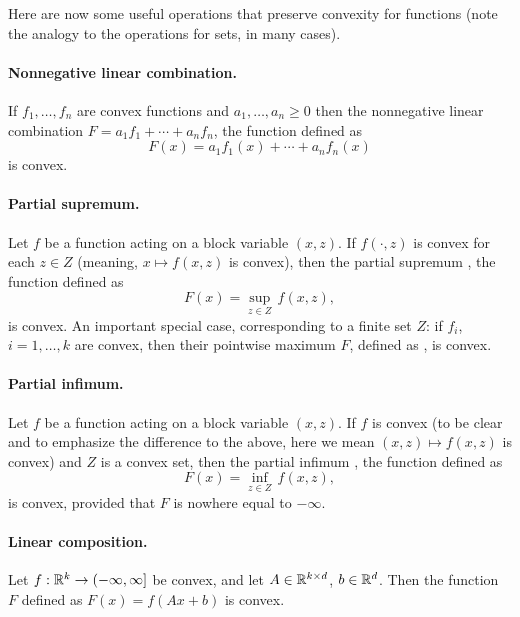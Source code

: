 \medskip

Here are now some useful operations that preserve convexity for functions (note
the analogy to the operations for sets, in many cases). 

\paragraph{Nonnegative linear combination.} 

If $f_1,\ldots,f_n$ are convex functions and $a_1,\ldots,a_n \geq 0$ then the
nonnegative linear combination $F = a_1f_1+\cdots+a_nf_n$, the function defined
as
\[
F(x) = a_1f_1(x) + \cdots + a_nf_n(x) 
\]
is convex.

\paragraph{Partial supremum.} 

Let $f$ be a function acting on a block variable $(x,z)$. If $f(\cdot,z)$ is
convex for each $z \in Z$ (meaning, $x \mapsto f(x,z)$ is convex), then the
partial supremum , the function defined
as  
\[
F(x) = \sup_{z \in Z} \, f(x,z),
\]
is convex. An important special case, corresponding to a finite set $Z$: if
$f_i$, $i=1,\ldots,k$ are convex, then their pointwise maximum $F$, defined as
, is convex.      

\paragraph{Partial infimum.} 

Let $f$ be a function acting on a block variable $(x,z)$. If $f$ is convex (to
be clear and to emphasize the difference to the above, here we mean $(x,z)
\mapsto f(x,z)$ is convex) and $Z$ is a convex set, then the partial infimum
, the function defined as  
\[
F(x) = \inf_{z \in Z} \, f(x,z),
\]
is convex, provided that $F$ is nowhere equal to $-\infty$. 

\paragraph{Linear composition.} 

Let $f : \mathbb{R}^k \to (-\infty, \infty]$ be convex, and let $A \in \mathbb{R}^{k \times d}$,
$b \in \mathbb{R}^d$. Then the function $F$ defined as $F(x) = f(Ax+b)$ is convex.     


